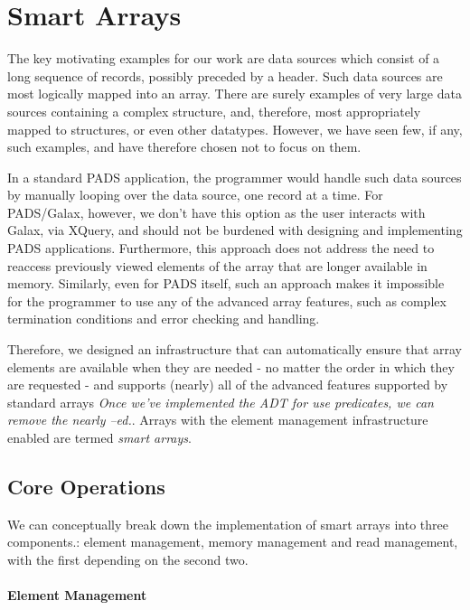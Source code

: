\documentclass{article}
\begin{document}
\section{Smart Arrays}
\label{sec:smart-arrays}

The key motivating examples for our work are data sources
which consist of a long sequence of records, possibly preceded by a
header. Such data sources are most logically mapped into an array.
There are surely examples of very large data sources containing a
complex structure, and, therefore, most appropriately mapped to
structures, or even other datatypes. However, we have seen few, if
any, such examples, and have therefore chosen not to focus on them.

In a standard PADS application, the programmer would handle such data
sources by manually looping over the data source, one record at a
time. For PADS/Galax, however, we don't have this option as the user
interacts with Galax, via XQuery, and should not be burdened with
designing and implementing PADS applications. Furthermore, this
approach does not address the need to reaccess previously viewed
elements of the array that are longer available in memory. Similarly,
even for PADS itself, such an approach makes it impossible for the
programmer to use any of the advanced array features, such as complex
termination conditions and error checking and handling.

Therefore, we designed an infrastructure that can automatically ensure
that array elements are available when they are needed - no matter the
order in which they are requested - and supports (nearly) all of the
advanced features supported by standard arrays {\em Once we've
  implemented the ADT for use predicates, we can remove the nearly
  --ed.}.
Arrays with the element management infrastructure enabled are termed
{\em smart arrays}.


\subsection{Core Operations}
\label{subsec:core-features}

We can conceptually break down the implementation of smart arrays into
three components.: element management, memory management
and read management, with the first depending on the second two.

\paragraph{Element Management}
\end{document}

